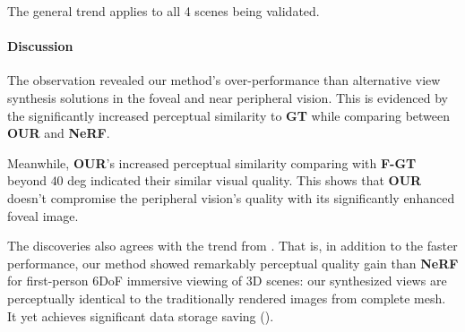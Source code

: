 The general trend applies to all 4 scenes being validated. 

\paragraph{Discussion}
The observation revealed our method's over-performance than alternative view synthesis solutions in the foveal and near peripheral vision. This is evidenced by the significantly increased perceptual similarity to \textbf{GT} while comparing between \textbf{OUR} and \textbf{NeRF}.

Meanwhile, \textbf{OUR}'s increased perceptual similarity comparing with \textbf{F-GT} beyond $40$ deg indicated their similar visual quality. This shows that \textbf{OUR} doesn't compromise the peripheral vision's quality with its significantly enhanced foveal image. 

The discoveries also agrees with the trend from . That is, in addition to the faster performance, our method showed remarkably perceptual quality gain than \textbf{NeRF} for first-person 6DoF immersive viewing of 3D scenes: our synthesized views are perceptually identical to the traditionally rendered images from complete mesh. It yet achieves significant data storage saving ().

